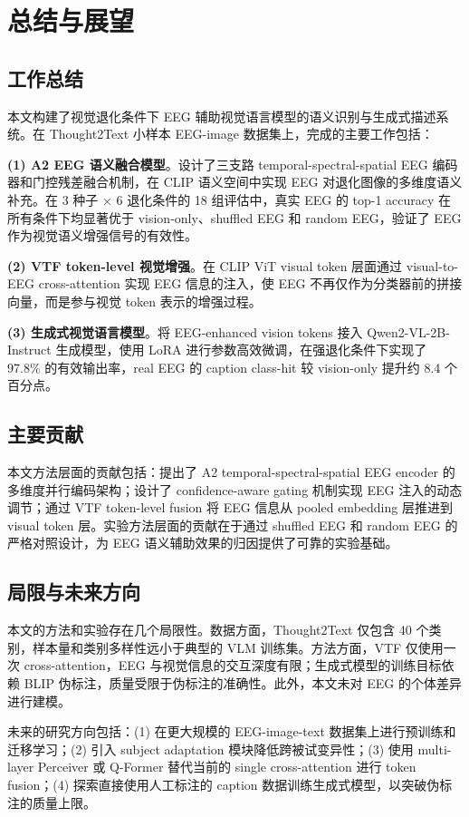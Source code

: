 \section{总结与展望}

\subsection{工作总结}

本文构建了视觉退化条件下 EEG 辅助视觉语言模型的语义识别与生成式描述系统。在 Thought2Text 小样本 EEG-image 数据集上，完成的主要工作包括：

\textbf{(1) A2 EEG 语义融合模型}。设计了三支路 temporal-spectral-spatial EEG 编码器和门控残差融合机制，在 CLIP 语义空间中实现 EEG 对退化图像的多维度语义补充。在 3 种子 × 6 退化条件的 18 组评估中，真实 EEG 的 top-1 accuracy 在所有条件下均显著优于 vision-only、shuffled EEG 和 random EEG，验证了 EEG 作为视觉语义增强信号的有效性。

\textbf{(2) VTF token-level 视觉增强}。在 CLIP ViT visual token 层面通过 visual-to-EEG cross-attention 实现 EEG 信息的注入，使 EEG 不再仅作为分类器前的拼接向量，而是参与视觉 token 表示的增强过程。

\textbf{(3) 生成式视觉语言模型}。将 EEG-enhanced vision tokens 接入 Qwen2-VL-2B-Instruct 生成模型，使用 LoRA 进行参数高效微调，在强退化条件下实现了 97.8\% 的有效输出率，real EEG 的 caption class-hit 较 vision-only 提升约 8.4 个百分点。

\subsection{主要贡献}

本文方法层面的贡献包括：提出了 A2 temporal-spectral-spatial EEG encoder 的多维度并行编码架构；设计了 confidence-aware gating 机制实现 EEG 注入的动态调节；通过 VTF token-level fusion 将 EEG 信息从 pooled embedding 层推进到 visual token 层。实验方法层面的贡献在于通过 shuffled EEG 和 random EEG 的严格对照设计，为 EEG 语义辅助效果的归因提供了可靠的实验基础。

\subsection{局限与未来方向}

本文的方法和实验存在几个局限性。数据方面，Thought2Text 仅包含 40 个类别，样本量和类别多样性远小于典型的 VLM 训练集。方法方面，VTF 仅使用一次 cross-attention，EEG 与视觉信息的交互深度有限；生成式模型的训练目标依赖 BLIP 伪标注，质量受限于伪标注的准确性。此外，本文未对 EEG 的个体差异进行建模。

未来的研究方向包括：(1) 在更大规模的 EEG-image-text 数据集上进行预训练和迁移学习；(2) 引入 subject adaptation 模块降低跨被试变异性；(3) 使用 multi-layer Perceiver 或 Q-Former 替代当前的 single cross-attention 进行 token fusion；(4) 探索直接使用人工标注的 caption 数据训练生成式模型，以突破伪标注的质量上限。
